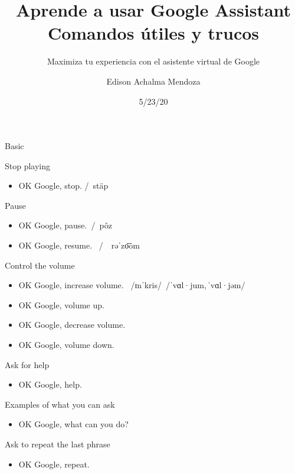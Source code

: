 \documentclass[
  a4paper,
]{article}
\title{Aprende a usar Google Assistant Comandos útiles y trucos}
\subtitle{Maximiza tu experiencia con el asistente virtual de Google}
\author{Edison Achalma Mendoza}
\date{5/23/20}
\providecommand{\tightlist}{%
  \setlength{\itemsep}{0pt}\setlength{\parskip}{0pt}}\usepackage{longtable,booktabs,array}
\renewcommand*\contentsname{Table of contents}
\newcommand\contentsname{Table of contents}
\begin{document}
\maketitle
\ifdefined\Shaded\renewenvironment{Shaded}{\begin{tcolorbox}[breakable, boxrule=0pt, borderline west={3pt}{0pt}{shadecolor}, enhanced, interior hidden, sharp corners, frame hidden]}{\end{tcolorbox}}\fi

\renewcommand*\contentsname{Contenidos}
{
\hypersetup{linkcolor=}
\setcounter{tocdepth}{3}
\tableofcontents
}
\listoffigures
\listoftables
Basic

Stop playing

\begin{itemize}
\tightlist
\item
  OK Google, stop. /~stäp
\end{itemize}

Pause~~

\begin{itemize}
\tightlist
\item
  OK Google, pause.~/~pôz
\item
  OK Google, resume.~ /~~rəˈzo͞om
\end{itemize}

Control the volume

\begin{itemize}
\tightlist
\item
  OK Google, increase volume.~ /ɪnˈkris/ \,/ˈvɑl·jum,\,ˈvɑl·jəm/
\item
  OK Google, volume up.
\item
  OK Google, decrease volume.
\item
  OK Google, volume down.
\end{itemize}

Ask for help

\begin{itemize}
\tightlist
\item
  OK Google, help.
\end{itemize}

Examples of what you can ask

\begin{itemize}
\tightlist
\item
  OK Google, what can you do?
\end{itemize}

Ask to repeat the last phrase

\begin{itemize}
\tightlist
\item
  OK Google, repeat.
\end{itemize}
\end{document}
